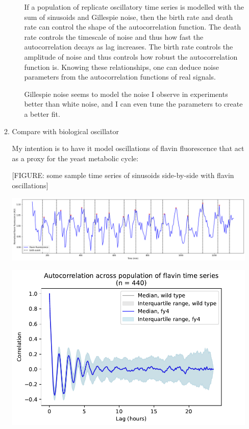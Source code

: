 \begin{enumerate}
\begin{enumerate}
\begin{enumerate}
If a population of replicate oscillatory time series is modelled with the sum of sinusoids and Gillespie noise, then the birth rate and death rate can control the shape of the autocorrelation function.  The death rate controls the timescale of noise and thus how fast the autocorrelation decays as lag increases.  The birth rate controls the amplitude of noise and thus controls how robust the autocorrelation function is.  Knowing these relationships, one can deduce noise parameters from the autocorrelation functions of real signals.

Gillespie noise seems to model the noise I observe in experiments better than white noise, and I can even tune the parameters to create a better fit.
\end{enumerate}

\item Compare with biological oscillator
\label{sec:orgbccdb4a}

My intention is to have it model oscillations of flavin fluorescence that act as a proxy for the yeast metabolic cycle:

[FIGURE: some sample time series of sinusoids side-by-side with flavin oscillations]

\begin{center}
\includegraphics[width=.9\linewidth]{26643_ts.png}
\end{center}

\begin{center}
\includegraphics[width=.9\linewidth]{fy4_26643_plots_06.png}
\end{center}
\end{enumerate}


\end{enumerate}
